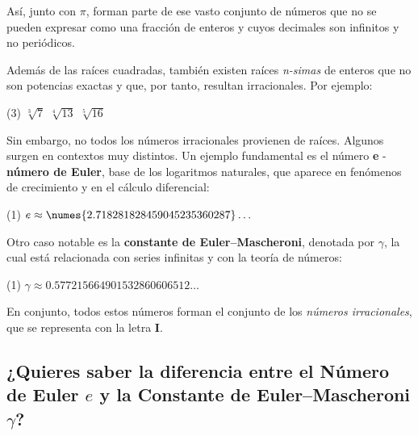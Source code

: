 Así, junto con $\pi$, forman parte de ese vasto conjunto de números que no se pueden expresar
como una fracción de enteros y cuyos decimales son infinitos y no periódicos.

Además de las raíces cuadradas, también existen raíces \textit{n-simas} de enteros que no son 
potencias exactas y que, por tanto, resultan irracionales.  
Por ejemplo:  

\begin{ejemplos3bullet}(3)
  \task $\sqrt[3]{7}$
  \task $\sqrt[4]{13}$
  \task $\sqrt[5]{16}$
 \end{ejemplos3bullet} 

Sin embargo, no todos los números irracionales provienen de raíces.  
Algunos surgen en contextos muy distintos.  
Un ejemplo fundamental es el número \textbf{e} - \textbf{número de Euler}, base de los logaritmos 
naturales, que aparece en fenómenos de crecimiento y en el cálculo diferencial:  

\begin{ejemplos1bullet}(1)
  \task $e \approx \numes{2.718281828459045235360287}\ldots$
\end{ejemplos1bullet}

Otro caso notable es la \textbf{constante de Euler--Mascheroni}, denotada por $\gamma$, la cual 
está relacionada con series infinitas y con la teoría de números:  

\begin{ejemplos1bullet}(1)
  \task $\gamma \approx \num{0.577215664901532860606512}\ldots$
\end{ejemplos1bullet}

En conjunto, todos estos números forman el conjunto de los \textit{números irracionales}, 
que se representa con la letra $\mathbf{I}$.

\subsection*{¿Quieres saber la diferencia entre el Número de Euler $e$ y la Constante de Euler--Mascheroni $\gamma$?}

